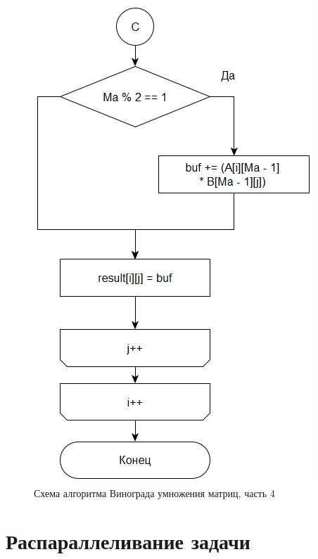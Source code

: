 \documentclass[12pt]{report}
\begin{document}
\begin{figure}[h]
	\centering
	\includegraphics[scale=1.1]{p4.png}
	\caption{Схема алгоритма Винограда умножения матриц, часть 4}
	\label{fig:p4}
\end{figure}

\newpage

\section{Распараллеливание задачи}
\end{document}
